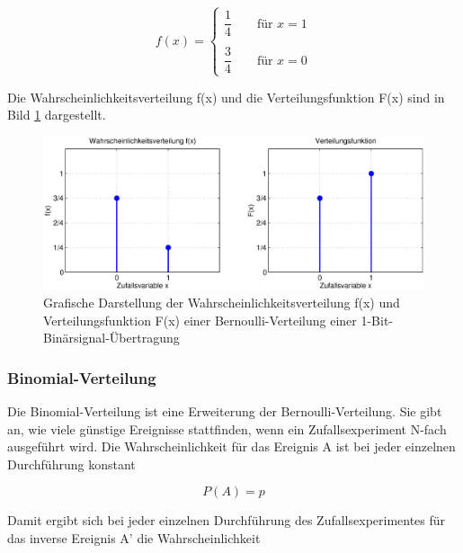 \begin{equation}\label{eq:fourhundredtwentysix}
f(x)=\left\{\begin{array}{l} {\dfrac{1}{4}\qquad \text{für } x=1} \\
\\
{\dfrac{3}{4}\qquad \text{für } x=0} \end{array}\right.
\end{equation}

\noindent Die Wahrscheinlichkeitsverteilung f(x) und die Verteilungsfunktion F(x) sind in Bild \ref{fig:Diskret_Bernoulli_Signaluebertragung} dargestellt.

\clearpage

\noindent 
\begin{figure}[H]
  \centerline{\includegraphics[width=1\textwidth]{Kapitel4/Bilder/image11}}
  \caption{Grafische Darstellung der Wahrscheinlichkeitsverteilung f(x) und Verteilungsfunktion F(x) einer Bernoulli-Verteilung einer 1-Bit-Bin\"{a}rsignal-\"{U}bertragung}
  \label{fig:Diskret_Bernoulli_Signaluebertragung}
\end{figure}

\subsubsection{Binomial-Verteilung}

\noindent Die Binomial-Verteilung ist eine Erweiterung der Bernoulli-Verteilung. Sie gibt an, wie viele g\"{u}nstige Ereignisse stattfinden, wenn ein Zufallsexperiment N-fach ausgef\"{u}hrt wird. Die Wahrscheinlichkeit f\"{u}r das Ereignis A ist bei jeder einzelnen Durchf\"{u}hrung konstant

\begin{equation}\label{eq:fourhundredtwentyseven}
P(A)=p
\end{equation}

\noindent Damit ergibt sich bei jeder einzelnen Durchf\"{u}hrung des Zufallsexperimentes f\"{u}r das inverse Ereignis A' die Wahrscheinlichkeit 

